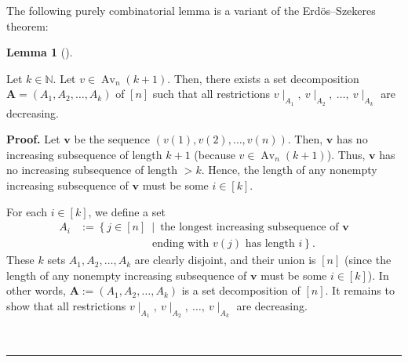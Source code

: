 \documentclass[numbers=enddot,12pt,final,onecolumn,notitlepage]{scrartcl}%
\numberwithin{exer}{subsection}
\theoremstyle{definition}
\newtheorem{lem}[theo]{Lemma}
\newenvironment{lemma}[1][]
{\begin{lem}[#1]\begin{leftbar}}
{\end{leftbar}\end{lem}}
\newenvironment{proof}[1][Proof]{\noindent\textbf{#1.} }{\ \rule{0.5em}{0.5em}}
\begin{document}
The following purely combinatorial lemma is a variant of the
Erd\"{o}s--Szekeres theorem:

\begin{lemma}
\label{lem.erdos-szek-var}Let $k\in\mathbb{N}$. Let $v\in\operatorname*{Av}%
\nolimits_{n}\left(  k+1\right)  $. Then, there exists a set decomposition
$\mathbf{A}=\left(  A_{1},A_{2},\ldots,A_{k}\right)  $ of $\left[  n\right]  $
such that all restrictions $v\mid_{A_{1}},\ v\mid_{A_{2}},\ \ldots
,\ v\mid_{A_{k}}$ are decreasing.
\end{lemma}

\begin{proof}
Let $\mathbf{v}$ be the sequence $\left(  v\left(  1\right)  ,v\left(
2\right)  ,\ldots,v\left(  n\right)  \right)  $. Then, $\mathbf{v}$ has no
increasing subsequence of length $k+1$ (because $v\in\operatorname*{Av}%
\nolimits_{n}\left(  k+1\right)  $). Thus, $\mathbf{v}$ has no increasing
subsequence of length $>k$. Hence, the length of any nonempty increasing
subsequence of $\mathbf{v}$ must be some $i\in\left[  k\right]  $.

For each $i\in\left[  k\right]  $, we define a set%
\begin{align*}
A_{i}  &  :=\left\{  j\in\left[  n\right]  \ \mid\ \text{the longest
increasing subsequence of }\mathbf{v}\right. \\
&  \ \ \ \ \ \ \ \ \ \ \ \ \ \ \ \ \ \ \ \ \ \ \ \ \ \ \ \ \ \ \left.
\text{ending with }v\left(  j\right)  \text{ has length }i\right\}  .
\end{align*}
These $k$ sets $A_{1},A_{2},\ldots,A_{k}$ are clearly disjoint, and their
union is $\left[  n\right]  $ (since the length of any nonempty increasing
subsequence of $\mathbf{v}$ must be some $i\in\left[  k\right]  $). In other
words, $\mathbf{A}:=\left(  A_{1},A_{2},\ldots,A_{k}\right)  $ is a set
decomposition of $\left[  n\right]  $. It remains to show that all
restrictions $v\mid_{A_{1}},\ v\mid_{A_{2}},\ \ldots,\ v\mid_{A_{k}}$ are decreasing.


\end{proof}
\end{document}
